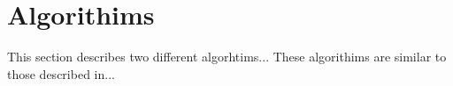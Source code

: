\section{Algorithims}
\label{sec:Algorithims}

This section describes two different algorhtims... These algorithims are similar to those described in...
